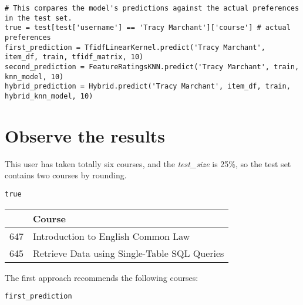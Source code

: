 \begin{verbatim}
# This compares the model's predictions against the actual preferences in the test set.
true = test[test['username'] == 'Tracy Marchant']['course'] # actual preferences
first_prediction = TfidfLinearKernel.predict('Tracy Marchant', item_df, train, tfidf_matrix, 10)
second_prediction = FeatureRatingsKNN.predict('Tracy Marchant', train, knn_model, 10)
hybrid_prediction = Hybrid.predict('Tracy Marchant', item_df, train, hybrid_knn_model, 10)
\end{verbatim}

\section{Observe the results}

This user has taken totally six courses, and the \textit{test\_size} is 25\%, 
so the test set contains two courses by rounding.

\begin{verbatim}
true
\end{verbatim}

\begin{table}[H]
\small
\begin{tabular}{|p{0.5cm}|p{10cm}|}
\hline
& Course \\
\hline
647 & Introduction to English Common Law \\
645 & Retrieve Data using Single-Table SQL Queries \\
\hline
\end{tabular}
\end{table}

\newpage
\noindent The first approach recommends the following courses:

\begin{verbatim}
first_prediction
\end{verbatim}


